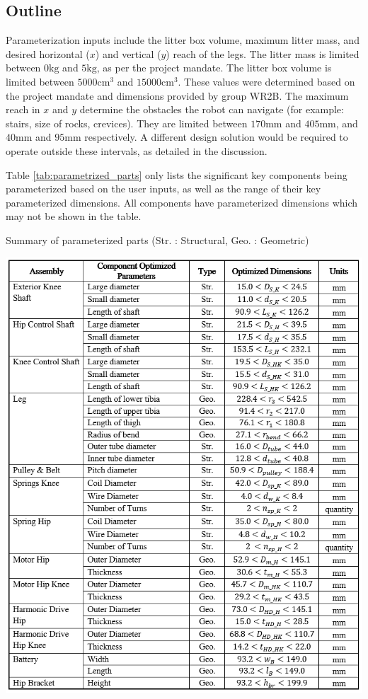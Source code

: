 \subsection{Outline}

Parameterization inputs include the litter box volume, maximum litter mass, and desired horizontal ($x$) and vertical ($y$) reach of the legs.
The litter mass is limited between $0\text{kg}$ and $5\text{kg}$, as per the project mandate. The litter box volume is limited between $5000\text{cm}^3$ and $15000\text{cm}^3$. These values were determined based on the project mandate and dimensions provided by group WR2B.
The maximum reach in $x$ and $y$ determine the obstacles the robot can navigate (for example: stairs, size of rocks, crevices). They are limited between $170\text{mm}$ and $405\text{mm}$, and $40\text{mm}$ and $95\text{mm}$ respectively. A different design solution would be required to operate outside these intervals, as detailed in the discussion.

Table \ref{tab:parametrized_parts} only lists the significant key components being parameterized based on the user inputs, as well as the range of their key parameterized dimensions. All components have parameterized dimensions which may not be shown in the table. 

\begin{table}
    \caption{Summary of parameterized parts (Str. : Structural, Geo. : Geometric)}
    \centering
    \includegraphics[width=\textwidth]{3_Parametrization/img/ParaTable.PNG}
    \label{tab:parametrized_parts}
\end{table}{}
